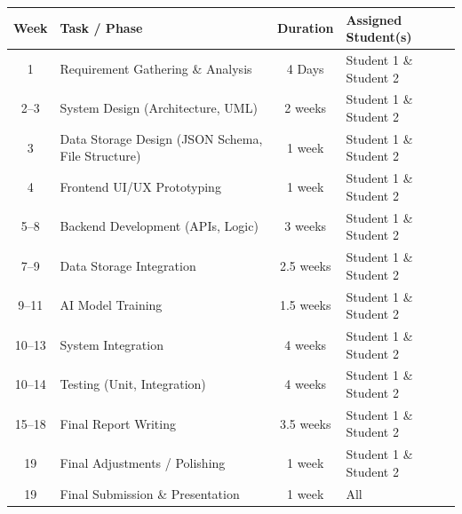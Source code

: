 \begin{center}
\renewcommand{\arraystretch}{1.3}
\begin{tabular}{|c|p{6cm}|c|p{4cm}|}
\hline
\textbf{Week} & \textbf{Task / Phase} & \textbf{Duration} & \textbf{Assigned Student(s)} \\
\hline
1  & Requirement Gathering \& Analysis                 & 4 Days & Student 1 \& Student 2 \\
\hline
2--3  & System Design (Architecture, UML)                & 2 weeks & Student 1 \& Student 2   \\
\hline
3  & Data Storage Design (JSON Schema, File Structure)   & 1 week                     & Student 1 \& Student 2               \\
\hline
4  & Frontend UI/UX Prototyping                       & 1 week & Student 1 \& Student 2                 \\
\hline
5--8  & Backend Development (APIs, Logic)                & 3 weeks & Student 1 \& Student 2                \\
\hline
7--9  &Data Storage Integration                             & 2.5 weeks & Student 1 \& Student 2                 \\
\hline
9--11  & AI Model Training                                & 1.5 weeks &Student 1 \& Student 2                \\
\hline
10--13 & System Integration                                   & 4 weeks & Student 1 \& Student 2                     \\
\hline
10--14& Testing (Unit, Integration)                  & 4 weeks & Student 1 \& Student 2   \\
\hline
15--18& Final Report Writing                                & 3.5 weeks & Student 1 \& Student 2   \\
\hline
19    & Final Adjustments / Polishing                    & 1 week  & Student 1 \& Student 2                      \\
\hline
19    & Final Submission \& Presentation                  & 1 week  & All                      \\
\hline

\end{tabular}
\end{center}

